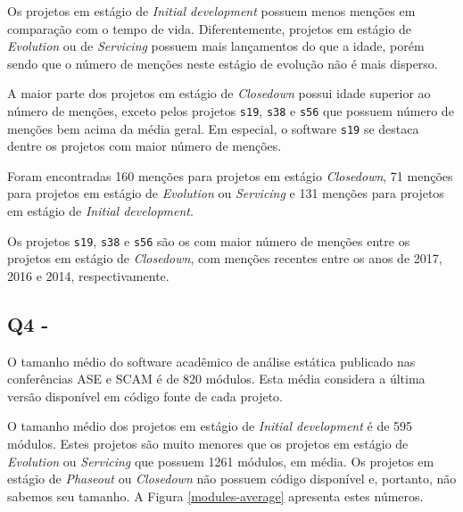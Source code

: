 Os projetos em estágio de {\it Initial development} possuem menos menções em %
comparação com o tempo de vida. 
Diferentemente, projetos em estágio de {\it Evolution} ou de {\it Servicing} 
possuem mais lançamentos do que a idade, porém
sendo que o número de menções neste estágio de evolução não é mais disperso. %

A maior parte dos projetos em estágio de {\it Closedown} possui idade superior ao número
de menções, exceto pelos projetos \texttt{s19}, \texttt{s38} e
\texttt{s56} que possuem número de menções bem acima da média geral.
Em especial, o software \texttt{s19} se destaca dentre os projetos com maior número de menções.

Foram encontradas 160 menções para projetos em estágio {\it Closedown}, %
71 menções para projetos em estágio de {\it Evolution} ou {\it Servicing} e 
131 menções para projetos em estágio de {\it Initial development}.

Os projetos \texttt{s19}, \texttt{s38} e \texttt{s56} são os com maior número de
menções entre os projetos em estágio de {\it Closedown}, com menções
recentes entre os anos de 2017, 2016 e 2014, respectivamente.

\subsection{Q4 - \QuestaoQuatro} %

O tamanho médio do software acadêmico de análise estática publicado nas
conferências ASE e SCAM é de 820 módulos. 
Esta média considera a última versão disponível em código fonte de cada projeto.


O tamanho médio dos projetos em estágio de {\it Initial development} é de 595
módulos. Estes projetos são muito menores que os projetos em estágio de {\it Evolution} 
ou  {\it Servicing} que possuem 1261 módulos, em média. 
Os projetos em estágio de {\it Phaseout} ou {\it Closedown} não possuem código disponível e,
portanto, não sabemos seu tamanho.
A Figura \ref{modules-average} apresenta estes números.


